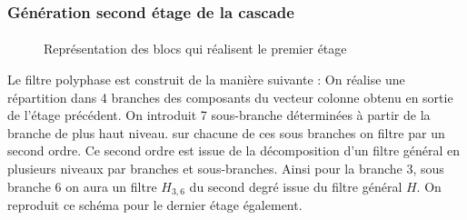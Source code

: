 \documentclass[
10pt,
aspectratio=169,
]{beamer}
\begin{document}
\begin{frame}
\frametitle{Génération second étage de la cascade}
\framesubtitle{}
\begin{figure}[!h]
\center
{}
\caption{Représentation des blocs qui réalisent le premier étage}
\end{figure}
Le filtre polyphase est construit de la manière suivante : On réalise une répartition dans 4 branches des composants du vecteur colonne obtenu en sortie de l'étage précédent. On introduit  7 sous-branche déterminées à partir de la branche de plus haut niveau. sur chacune de ces sous branches on filtre par un second ordre. Ce second ordre est issue de la décomposition d'un filtre général en plusieurs niveaux par branches et sous-branches. Ainsi pour la branche 3, sous branche 6 on aura un filtre $H_{3,6}$ du second degré issue du filtre général $H$. On reproduit ce schéma pour le dernier étage également. 


\end{frame}
\end{document}
